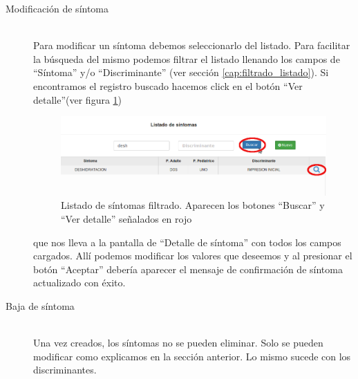 \begin{description}
\item[Modificación de síntoma] \mbox{} \\
Para modificar un síntoma debemos seleccionarlo del listado. Para facilitar la búsqueda del mismo podemos filtrar el listado llenando los campos de ``Síntoma'' y/o ``Discriminante'' (ver sección \ref{cap:filtrado_listado}). Si encontramos el registro buscado hacemos click en el botón ``Ver detalle''(ver figura \ref{fig:sintomas_filtro}) 
\begin{figure}
\centerline{\includegraphics[width=1\textwidth]{sintomas_listado_buscar.png}}
\caption{Listado de síntomas filtrado. Aparecen los botones ``Buscar'' y ``Ver detalle'' señalados en rojo}
\label{fig:sintomas_filtro}
\end{figure}
que nos lleva a la pantalla de ``Detalle de síntoma'' con todos los campos cargados. Allí podemos modificar los valores que deseemos y al presionar el botón ``Aceptar'' debería aparecer el mensaje de confirmación de síntoma actualizado con éxito.

\item[Baja de síntoma] \mbox{} \\
Una vez creados, los síntomas no se pueden eliminar. Solo se pueden modificar como explicamos en la sección anterior. Lo mismo sucede con los discriminantes.

\end{description}

